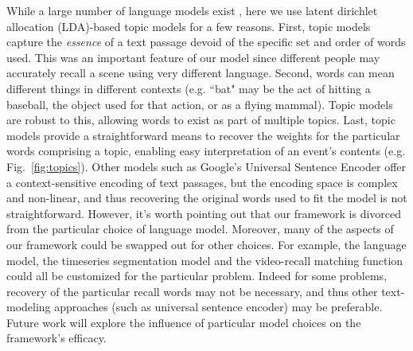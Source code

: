 \documentclass{article}
\begin{document}
While a large number of language models exist \citep[e.g., WAS, LSA, word2vec, universal sentence encoder;][]{SteyEtal04, LandEtal98, MikoEtal13, CerEtal18}, here we use latent dirichlet allocation (LDA)-based topic models for a few reasons.  First, topic models capture the \textit{essence} of a text passage devoid of the specific set and order of words used.  This was an important feature of our model since different people may accurately recall a scene using very different language. Second, words can mean different things in different contexts (e.g. ``bat" may be the act of hitting a baseball, the object used for that action, or as a flying mammal).  Topic models are robust to this, allowing words to exist as part of multiple topics.  Last, topic models provide a straightforward means to recover the weights for the particular words comprising a topic, enabling easy interpretation of an event's contents (e.g. Fig.~\ref{fig:topics}). Other models such as Google's Universal Sentence Encoder offer a context-sensitive encoding of text passages, but the encoding space is complex and non-linear, and thus recovering the original words used to fit the model is not straightforward. However, it's worth pointing out that our framework is divorced from the particular choice of language model. Moreover, many of the aspects of our framework could be swapped out for other choices. For example, the language model, the timeseries segmentation model and the video-recall matching function could all be customized for the particular problem. Indeed for some problems, recovery of the particular recall words may not be necessary, and thus other text-modeling approaches (such as universal sentence encoder) may be preferable. Future work will explore the influence of particular model choices on the framework's efficacy.
\end{document}
